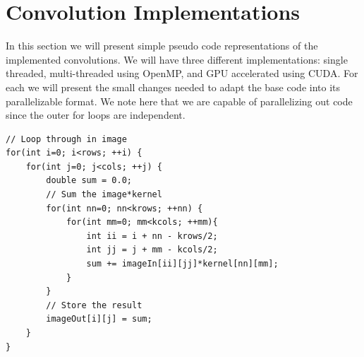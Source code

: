 \documentclass{article}
\begin{document}
\begin{figure}[H]%
    \centering
    \qquad
\end{figure}




\section{Convolution Implementations}

In this section we will present simple pseudo code representations of the implemented convolutions.
We will have three different implementations: single threaded, multi-threaded using OpenMP, and GPU accelerated using CUDA.
For each we will present the small changes needed to adapt the base code into its parallelizable format.
We note here that we are capable of parallelizing out code since the outer for loops are independent.

\begin{verbatim}
// Loop through in image
for(int i=0; i<rows; ++i) {
    for(int j=0; j<cols; ++j) {
		double sum = 0.0;
		// Sum the image*kernel
		for(int nn=0; nn<krows; ++nn) {
			for(int mm=0; mm<kcols; ++mm){
				int ii = i + nn - krows/2;
				int jj = j + mm - kcols/2;
				sum += imageIn[ii][jj]*kernel[nn][mm];
			}
		}
		// Store the result
		imageOut[i][j] = sum;
	}
}
\end{verbatim}
\end{document}
